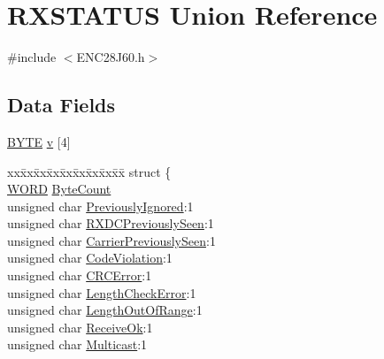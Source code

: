 \hypertarget{union_r_x_s_t_a_t_u_s}{}\section{R\+X\+S\+T\+A\+T\+U\+S Union Reference}
\label{union_r_x_s_t_a_t_u_s}


{\ttfamily \#include $<$E\+N\+C28\+J60.\+h$>$}

\subsection*{Data Fields}
\begin{DoxyCompactItemize}
\item 
\hyperlink{_generic_type_defs_8h_a4ae1dab0fb4b072a66584546209e7d58}{B\+Y\+T\+E} \hyperlink{union_r_x_s_t_a_t_u_s_a32c4cdd65ca9bf67a46f0a42448489d8}{v} \mbox{[}4\mbox{]}
\item 
\begin{tabbing}
xx\=xx\=xx\=xx\=xx\=xx\=xx\=xx\=xx\=\kill
struct \{\\
\>\hyperlink{_generic_type_defs_8h_a2b0e863dadf920709ec53d9088ee7c91}{WORD} \hyperlink{union_r_x_s_t_a_t_u_s_a27fd548a7b630a21bbd9a0760290ef93}{ByteCount}\\
\>unsigned char \hyperlink{union_r_x_s_t_a_t_u_s_a96946cdf03b86471a38c97c177eaedd7}{PreviouslyIgnored}:1\\
\>unsigned char \hyperlink{union_r_x_s_t_a_t_u_s_a105bf29697fb000a90eeb15cfe0d2a45}{RXDCPreviouslySeen}:1\\
\>unsigned char \hyperlink{union_r_x_s_t_a_t_u_s_ac20aa9c2985602a016cfcae7edb179f1}{CarrierPreviouslySeen}:1\\
\>unsigned char \hyperlink{union_r_x_s_t_a_t_u_s_abf8a0bb18e0f19552522eb5fce572373}{CodeViolation}:1\\
\>unsigned char \hyperlink{union_r_x_s_t_a_t_u_s_a4eb22bd1c361b173b9a70fd9f1a0f1e4}{CRCError}:1\\
\>unsigned char \hyperlink{union_r_x_s_t_a_t_u_s_a6100c4d76ea1b4110a4e6efffa431e65}{LengthCheckError}:1\\
\>unsigned char \hyperlink{union_r_x_s_t_a_t_u_s_a390dd13a1eb0ef079f6dd40e0f12759e}{LengthOutOfRange}:1\\
\>unsigned char \hyperlink{union_r_x_s_t_a_t_u_s_a65448b6bde554c9ca1bcd416b381d103}{ReceiveOk}:1\\
\>unsigned char \hyperlink{union_r_x_s_t_a_t_u_s_af1db8263c2237487c1065633cf2cc925}{Multicast}:1\\

\end{tabbing}
\end{DoxyCompactItemize}
